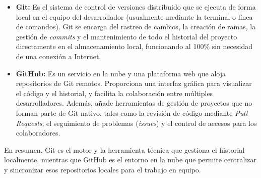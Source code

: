 \documentclass[12pt,letterpaper]{article}
\begin{document}
\begin{itemize}
    \item \textbf{Git:} Es el sistema de control de versiones distribuido que se ejecuta de forma local en el equipo del desarrollador (usualmente mediante la terminal o línea de comandos). Git se encarga del rastreo de cambios, la creación de ramas, la gestión de \textit{commits} y el mantenimiento de todo el historial del proyecto directamente en el almacenamiento local, funcionando al 100\% sin necesidad de una conexión a Internet.
    
    \item \textbf{GitHub:} Es un servicio en la nube y una plataforma web que aloja repositorios de Git remotos. Proporciona una interfaz gráfica para visualizar el código y el historial, y facilita la colaboración entre múltiples desarrolladores. Además, añade herramientas de gestión de proyectos que no forman parte de Git nativo, tales como la revisión de código mediante \textit{Pull Requests}, el seguimiento de problemas (\textit{issues}) y el control de accesos para los colaboradores.
\end{itemize}

En resumen, Git es el motor y la herramienta técnica que gestiona el historial localmente, mientras que GitHub es el entorno en la nube que permite centralizar y sincronizar esos repositorios locales para el trabajo en equipo.
\end{document}
